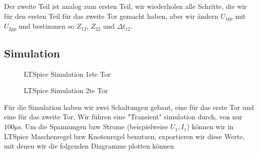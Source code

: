\par Der zweite Teil ist analog zum ersten Teil, wir wiederholen alle Schritte, die wir für den ersten Teil für das zweite Tor gemacht haben, aber wir ändern $U_{1pp}$ mit $U_{2pp}$ und bestimmen so $Z_{12}$, $Z_{22}$ und $\Delta t_{12}$.
%
%
%
\begin{flushright}
  \textit{\autorA}
\end{flushright}
%
%
%
%
\subsection{Simulation}
\label{subsec:3_Simulation}
%
%
\begin{figure}[H]
    \centering
    
    \caption{LTSpice Simulation 1ste Tor}
    \label{fig:LTSpice1}
\end{figure}
\newpage
\begin{figure}[H]
    \centering
    
    \caption{LTSpice Simulation 2te Tor}
    \label{fig:LTspice2}
\end{figure}
\newpage
Für die Simulation haben wir zwei Schaltungen gebaut, eine für das erste Tor und eine für das zweite Tor, Wir führen eine "Transient" simulation durch, von nur $100\si{\micro\second}$. Um die Spannungen bzw Strome (beispielweise $U_1,I_1$) können wir in LTSpice Maschenregel bzw Knotenregel benutzen, exportieren wir diese Werte, mit denen wir die folgenden Diagramme plotten können
